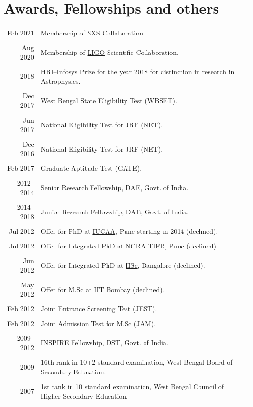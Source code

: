 \documentclass[10pt]{article}
\begin{document}
\section{Awards, Fellowships and others}
\begin{longtable}{r|p{16cm}}
Feb 2021 & Membership of \href{https://www.black-holes.org/}{SXS} Collaboration.\\\\
Aug 2020 & Membership of \href{https://www.ligo.org/}{LIGO} Scientific Collaboration.\\\\
2018 & HRI–Infosys Prize for the year 2018 for distinction in research in Astrophysics.\\\\
Dec 2017 & West Bengal State Eligibility Test (WBSET).\\\\
Jun 2017 & National Eligibility Test for JRF (NET).\\\\
Dec 2016 & National Eligibility Test for JRF (NET).\\\\
Feb 2017 & Graduate Aptitude Test (GATE).\\\\
2012--2014 & Senior Research Fellowship, DAE, Govt. of India.\\\\
2014--2018 & Junior Research Fellowship, DAE, Govt. of India.\\\\
Jul 2012 & Offer for PhD at \href{https://www.iucaa.in/}{IUCAA}, Pune starting in 2014 (declined).\\\\
Jul 2012 & Offer for Integrated PhD at \href{http://www.ncra.tifr.res.in/ncra/main}{NCRA-TIFR}, Pune (declined).\\\\
Jun 2012 & Offer for Integrated PhD at \href{https://www.iisc.ac.in/}{IISc}, Bangalore (declined).\\\\
May 2012 & Offer for M.Sc at \href{http://www.iitb.ac.in/}{IIT Bombay} (declined).\\\\
Feb 2012 & Joint Entrance Screening Test (JEST).\\\\
Feb 2012 & Joint Admission Test for M.Sc (JAM).\\\\
2009--2012 & INSPIRE Fellowship, DST, Govt. of India.\\\\
2009 & {\color{Maroon} 16th} rank in 10+2 standard examination, West Bengal Board of Secondary Education.\\\\
2007 & {\color{Maroon} 1st} rank in 10 standard examination, West Bengal Council of Higher Secondary Education.
\end{longtable}
\end{document}

